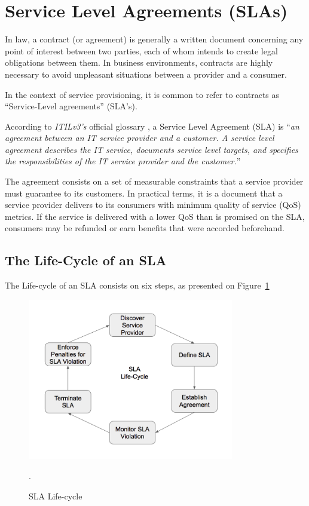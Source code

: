 \section{Service Level Agreements (SLAs)}

In law, a contract (or agreement) is generally a written document concerning any point of interest between two parties, each of whom intends to create legal obligations between them. In business environments, contracts are highly necessary to avoid unpleasant situations between a provider and a consumer. 

In the context of service provisioning, it is common to refer to contracts as ``Service-Level agreements'' (SLA's).  

According to \textit{ITILv3's} official glossary \cite{itilv3glossary}, a Service Level Agreement (SLA) is ``\textit{an agreement between an IT service provider and a customer. 
A service level agreement describes the IT service, documents service level targets, and specifies the responsibilities of the IT service provider and the customer.}'' 

The agreement consists on a set of measurable constraints that a service provider must guarantee to its customers.
In practical terms, it is a document that a service provider delivers to its consumers with minimum quality of service (QoS) metrics. 
If the service is delivered with a lower QoS than is promised on the SLA, consumers may be refunded or earn benefits that were accorded beforehand. 


\subsection{The Life-Cycle of an SLA}

The Life-cycle of an SLA consists on six steps, as presented on Figure~\ref{fig:sla-lifecycle}  

\begin{figure}[ht!]
\centering
\includegraphics[width=90mm]{Imagens/sla-lifecycle.png}
\caption{SLA Life-cycle \cite{wu2012service}}.\label{fig:sla-lifecycle}
\end{figure}

